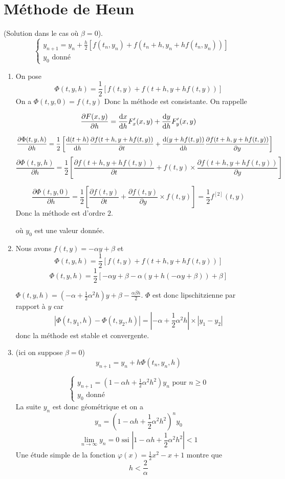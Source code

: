 \documentclass[a4paper]{article}
\def \de {{\rm d}}
\begin{document}
\section{Méthode de Heun}
(Solution dans le cas où $\beta=0$).
\[\left\{\begin{array}{l}
y_{n+1}=y_n+\frac h2\left[f(t_n,y_n)+f(t_n+h,y_n+hf(t_n,y_n))\right]\\
y_0 \mbox{ donné}
\end{array}\right.
\]


\begin{enumerate}
\item On pose 
\[\Phi(t,y,h)=\frac 12\left[f(t,y)+f(t+h,y+hf(t,y))\right]\]
On a $\Phi(t,y,0)=f(t,y)$
Donc la méthode est consistante. On rappelle

\[\frac{\partial F(x,y)}{\partial h}= \frac{\de x}{\de h}F'_x(x,y)+\frac{\de y}{\de h}F'_y(x,y)\]

\[\frac{\partial \Phi(t,y,h)}{\partial h}=\frac 12\left[\frac{\de (t+h)}{\de h}\frac{\partial f(t+h,y+hf(t,y))}{\partial t}+\frac{\de (y+hf(t,y))}{\de h}\frac{\partial f(t+h,y+hf(t,y))}{\partial y}\right]\]
\[\frac{\partial \Phi(t,y,h)}{\partial h}=\frac 12\left[\frac{\partial f(t+h,y+hf(t,y))}{\partial t}+f(t,y)\times \frac{\partial f(t+h,y+hf(t,y))}{\partial y}\right]\]

\[\frac{\partial \Phi(t,y,0)}{\partial h}=\frac 12\left[\frac{\partial f(t,y)}{\partial t}+\frac{\partial f(t,y)}{\partial y}\times f(t,y)\right]=\frac 12f^{[2]}(t,y)\]
Donc la méthode est d'ordre $2$.


où $y_0$ est une valeur donnée.

\item Nous avons $f(t,y)=-\alpha y+\beta$ et
\[\Phi(t,y,h)=\frac 12\left[f(t,y)+f(t+h,y+hf(t,y))\right]\]
\[\Phi(t,y,h)=\frac 12\left[-\alpha y+\beta-\alpha(y+h (-\alpha y+\beta))+\beta\right]\]

 $\Phi(t,y,h)=(-\alpha+\frac 12 \alpha^2 h)y + \beta -\frac{\alpha\beta h}2$. $\Phi$ est donc lipschitzienne par rapport à $y$ car
 \[|\Phi(t,y_1,h)-\Phi(t,y_2,h)|=|-\alpha+\frac 12 \alpha^2 h|\times|y_1-y_2|\]
 donc la méthode est stable et convergente. 
\item (ici on suppose $\beta=0$)
\[y_{n+1}=y_n+h \Phi(t_n,y_n,h)\]

\[\left\{\begin{array}{l}
y_{n+1}=\left(1-\alpha h +\frac 12 \alpha^2 h^2\right)y_n \mbox{ pour }n\geq 0\\
y_0 \mbox{ donné}
\end{array}\right.
\]
La suite $y_n$ est donc géométrique et on a
\[y_{n}=\left(1-\alpha h +\frac 12 \alpha^2 h^2\right)^ny_0\]
 \[\lim_{n\to\infty}y_n=0 \mbox{ ssi }\left|1-\alpha h +\frac 12 \alpha^2 h^2\right|<1\]
 Une étude simple de la fonction $\varphi(x)=\frac 12x^2-x+1$ montre que  
 \[h<\frac 2{\alpha}\]
\end{enumerate}
\end{document}
